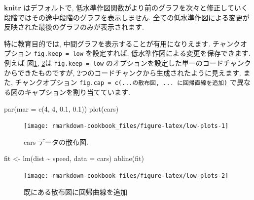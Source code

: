 \documentclass[
  11pt,
  lualatex,
  ja=standard]{bxjsreport}
\newenvironment{Shaded}{\begin{snugshade}}{\end{snugshade}}
\newcommand{\AttributeTok}[1]{\textcolor[rgb]{0.77,0.63,0.00}{#1}}
\newcommand{\DecValTok}[1]{\textcolor[rgb]{0.00,0.00,0.81}{#1}}
\newcommand{\FloatTok}[1]{\textcolor[rgb]{0.00,0.00,0.81}{#1}}
\newcommand{\FunctionTok}[1]{\textcolor[rgb]{0.00,0.00,0.00}{#1}}
\newcommand{\NormalTok}[1]{#1}
\newcommand{\OtherTok}[1]{\textcolor[rgb]{0.56,0.35,0.01}{#1}}
\newcommand{\SpecialCharTok}[1]{\textcolor[rgb]{0.00,0.00,0.00}{#1}}
\begin{document}
\textbf{knitr} はデフォルトで, 低水準作図関数がより前のグラフを次々と修正していく段階ではその途中段階のグラフを表示しません. 全ての低水準作図による変更が反映された最後のグラフのみが表示されます.

特に教育目的では, 中間グラフを表示することが有用になりえます. チャンクオプション \texttt{fig.keep = \textquotesingle{}low\textquotesingle{}} を設定すれば, 低水準作図による変更を保存できます. 例えば 図\ref{fig:low-plots-1}, \ref{fig:low-plots-2}は \texttt{fig.keep = \textquotesingle{}low\textquotesingle{}} のオプションを設定した単一のコードチャンクからできたものですが, 2つのコードチャンクから生成されたように見えます. また, チャンクオプション \texttt{fig.cap = c(\textquotesingle{}...の散布図\textquotesingle{},\ \textquotesingle{}...\ に回帰直線を追加\textquotesingle{})}  で異なる図のキャプションを割り当てています.

\begin{Shaded}
\begin{Highlighting}[numbers=left,,]
\FunctionTok{par}\NormalTok{(}\AttributeTok{mar =} \FunctionTok{c}\NormalTok{(}\DecValTok{4}\NormalTok{, }\DecValTok{4}\NormalTok{, }\FloatTok{0.1}\NormalTok{, }\FloatTok{0.1}\NormalTok{))}
\FunctionTok{plot}\NormalTok{(cars)}
\end{Highlighting}
\end{Shaded}

\begin{figure}

{\centering \texttt{[image: rmarkdown-cookbook\_files/figure-latex/low-plots-1]} 

}

\caption{cars データの散布図.}\label{fig:low-plots-1}
\end{figure}

\begin{Shaded}
\begin{Highlighting}[numbers=left,,]
\NormalTok{fit }\OtherTok{\textless{}{-}} \FunctionTok{lm}\NormalTok{(dist }\SpecialCharTok{\textasciitilde{}}\NormalTok{ speed, }\AttributeTok{data =}\NormalTok{ cars)}
\FunctionTok{abline}\NormalTok{(fit)}
\end{Highlighting}
\end{Shaded}

\begin{figure}

{\centering \texttt{[image: rmarkdown-cookbook\_files/figure-latex/low-plots-2]} 

}

\caption{既にある散布図に回帰曲線を追加}\label{fig:low-plots-2}
\end{figure}
\end{document}
